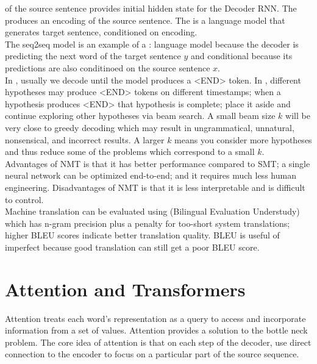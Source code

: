\documentclass{article}
\begin{document}
 of the source sentence provides initial hidden state for the Decoder RNN. The  produces an encoding of the source sentence. The  is a language model that generates target sentence, conditioned on encoding. \\ 

The seq2seq model is an example of a : language model because the decoder is predicting the next word of the target sentence $y$ and conditional because its predictions are also conditinoed on the source sentence $x$. \\ 

In , usually we decode until the model produces a <END> token. In , different hypotheses may produce <END> tokens on different timestamps; when a hypothesis produces <END> that hypothesis is complete; place it aside and continue exploring other hypotheses via beam search. A small beam size $k$ will be very close to greedy decoding which may result in ungrammatical, unnatural, nonsensical, and incorrect results. A larger $k$ means you consider more hypotheses and thus reduce some of the problems which correspond to a small $k$. \\ 

Advantages of NMT is that it has better performance compared to SMT; a single neural network can be optimized end-to-end; and it requires much less human engineering. Disadvantages of NMT is that it is less interpretable and is difficult to control. \\ 

Machine translation can be evaluated using  (Bilingual Evaluation Understudy) which has n-gram precision plus a penalty for too-short system translations; higher BLEU scores indicate better translation quality. BLEU is useful of imperfect because good translation can still get a poor BLEU score. 

\section{Attention and Transformers}

Attention treats each word's representation as a query to access and incorporate information from a set of values. Attention provides a solution to the bottle neck problem. The core idea of attention is that on each step of the decoder, use direct connection to the encoder to focus on a particular part of the source sequence. \\ 
\end{document}
